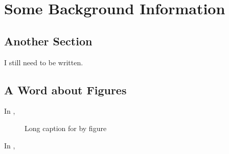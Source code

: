 \chapter{Some Background Information}
\label{ch:thisChapterLabel}

\section{Another Section}

I still need to be written.

\section{A Word about Figures}

In \latex,

\begin{figure}
    \caption[Caption for list of figures.]{Long caption for by figure}
    \label{fig:thisFigLabel}
\end{figure}




In \latex,

